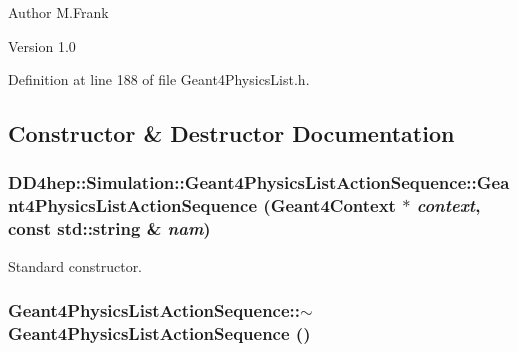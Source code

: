 \begin{DoxyAuthor}{Author}
M.Frank 
\end{DoxyAuthor}
\begin{DoxyVersion}{Version}
1.0 
\end{DoxyVersion}


Definition at line 188 of file Geant4PhysicsList.h.

\subsection{Constructor \& Destructor Documentation}
\hypertarget{class_d_d4hep_1_1_simulation_1_1_geant4_physics_list_action_sequence_a84052034e7ed2064137d76ee87af85d5}{
\subsubsection[{Geant4PhysicsListActionSequence}]{\setlength{\rightskip}{0pt plus 5cm}DD4hep::Simulation::Geant4PhysicsListActionSequence::Geant4PhysicsListActionSequence ({\bf Geant4Context} $\ast$ {\em context}, \/  const std::string \& {\em nam})}}
\label{class_d_d4hep_1_1_simulation_1_1_geant4_physics_list_action_sequence_a84052034e7ed2064137d76ee87af85d5}


Standard constructor. \hypertarget{class_d_d4hep_1_1_simulation_1_1_geant4_physics_list_action_sequence_a2b2989ac26194d0579cf02256fbe70f8}{
\subsubsection[{$\sim$Geant4PhysicsListActionSequence}]{\setlength{\rightskip}{0pt plus 5cm}Geant4PhysicsListActionSequence::$\sim$Geant4PhysicsListActionSequence ()}}
\label{class_d_d4hep_1_1_simulation_1_1_geant4_physics_list_action_sequence_a2b2989ac26194d0579cf02256fbe70f8}


